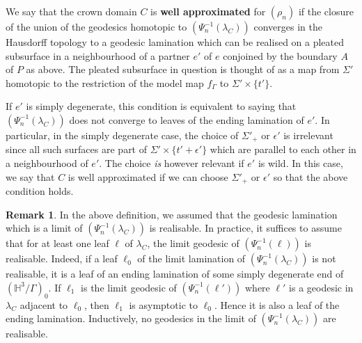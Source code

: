 \documentclass{amsart}
\theoremstyle{definition}
\newtheorem{rmk}[theorem]{Remark}
\newcommand\HHH{{\mathbb H}}
\begin{document}
We say that the crown domain $C$ is {\bf well approximated} for $(\rho_n)$ if  the closure of the union of the geodesics homotopic to $(\Psi_n^{-1}(\lambda_C))$ converges in the Hausdorff topology to a geodesic lamination which can be realised on a pleated subsurface in a neighbourhood of a partner $e'$ of $e$ conjoined by
 the boundary $A$ of $P$ as above. 
The pleated subsurface in question is thought of as a map from 
$\Sigma'$ homotopic to the restriction of the model map $f_\Gamma$ to $\Sigma' \times \{t'\}$.




If $e'$ is simply degenerate, this  condition is equivalent to saying that $(\Psi_n^{-1}(\lambda_C))$ does not converge to leaves of the ending lamination of $e'$.
In particular, in the simply degenerate case, the choice of $\Sigma'_+$ or $\epsilon'$ is irrelevant   since  all such surfaces are part of $\Sigma' \times \{t'+\epsilon'\}$ which  are parallel to each other in a neighbourhood of $e'$. The choice  {\em is} however relevant if $e'$ is wild. 
In this case, we say that $C$ is well approximated if we can choose $\Sigma'_+$ or $\epsilon'$ so that the above condition  holds.
\begin{rmk}
\label{leaf of EL}
In the above definition, we assumed that the geodesic lamination which is a limit of $(\Psi_n^{-1}(\lambda_C))$ is realisable.
In practice, it suffices to assume that  for at least one leaf $\ell$ of $\lambda_C$, the limit geodesic  of $(\Psi_n^{-1}(\ell))$ is realisable.
Indeed, if a leaf $\ell_0$ of the limit lamination of $(\Psi_n^{-1}(\lambda_C))$ is not realisable, it is a leaf of an ending lamination of some simply degenerate end of $(\HHH^3/\Gamma)_0$.
If $\ell_1$ is the limit geodesic of $(\Psi_n^{-1}(\ell'))$ where $\ell'$ is a geodesic in $\lambda_C$ adjacent to $\ell_0$, then $\ell_1$ is asymptotic to $\ell_0$. Hence it is also a leaf of the ending lamination.
Inductively, no geodesics in the limit of $(\Psi_n^{-1}(\lambda_C))$ are realisable.
\end{rmk}
\end{document}
